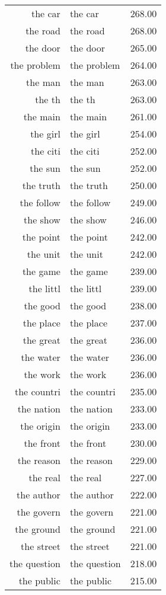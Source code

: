 \begin{table}[ht]
\begin{tabular}{rlr}
  the car & the car & 268.00 \\ 
  the road & the road & 268.00 \\ 
  the door & the door & 265.00 \\ 
  the problem & the problem & 264.00 \\ 
  the man & the man & 263.00 \\ 
  the th & the th & 263.00 \\ 
  the main & the main & 261.00 \\ 
  the girl & the girl & 254.00 \\ 
  the citi & the citi & 252.00 \\ 
  the sun & the sun & 252.00 \\ 
  the truth & the truth & 250.00 \\ 
  the follow & the follow & 249.00 \\ 
  the show & the show & 246.00 \\ 
  the point & the point & 242.00 \\ 
  the unit & the unit & 242.00 \\ 
  the game & the game & 239.00 \\ 
  the littl & the littl & 239.00 \\ 
  the good & the good & 238.00 \\ 
  the place & the place & 237.00 \\ 
  the great & the great & 236.00 \\ 
  the water & the water & 236.00 \\ 
  the work & the work & 236.00 \\ 
  the countri & the countri & 235.00 \\ 
  the nation & the nation & 233.00 \\ 
  the origin & the origin & 233.00 \\ 
  the front & the front & 230.00 \\ 
  the reason & the reason & 229.00 \\ 
  the real & the real & 227.00 \\ 
  the author & the author & 222.00 \\ 
  the govern & the govern & 221.00 \\ 
  the ground & the ground & 221.00 \\ 
  the street & the street & 221.00 \\ 
  the question & the question & 218.00 \\ 
  the public & the public & 215.00 \\ 

\end{tabular}
\end{table}
